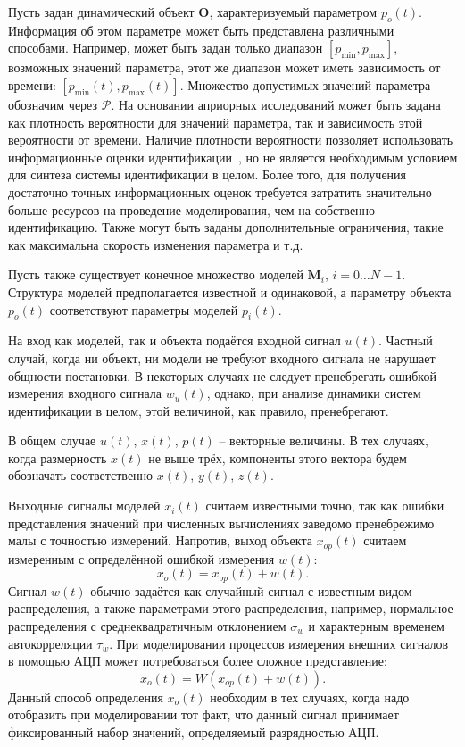 Пусть задан динамический объект $ \mathbf{O}$, характеризуемый параметром $p_o(t)$.
Информация об этом параметре может быть представлена
различными способами. Например, может быть задан только диапазон
$[p_{\min}, p_{\max}]$,
возможных значений параметра,
этот же диапазон может иметь зависимость от времени:
$[p_{\min}(t), p_{\max}(t)]$.
Множество допустимых значений параметра обозначим через $\mathcal{P}$.
На основании априорных исследований может
быть задана как плотность вероятности для значений параметра,
так и зависимость этой вероятности от времени. Наличие плотности вероятности
позволяет использовать информационные оценки идентификации~\cite{info_cipkin,atu_asau10},
но не является необходимым условием для синтеза системы идентификации в целом.
Более того, для получения достаточно точных информационных оценок
требуется затратить значительно больше ресурсов на проведение моделирования,
чем на собственно идентификацию.
Также могут быть заданы дополнительные ограничения, такие как максимальна скорость
изменения параметра и т.д.

Пусть также существует конечное множество моделей
\label{atu:d:N}$\mathbf{M}_i$, $i=0 \ldots N-1$.
Структура моделей предполагается известной и одинаковой,
а параметру объекта $p_o(t)$ соответствуют параметры моделей $p_{i}(t)$.

На вход как моделей, так и объекта подаётся входной сигнал \label{atu:d:u}$u(t)$.
Частный случай, когда ни объект, ни модели не требуют входного сигнала
не нарушает общности постановки. В некоторых случаях
не следует пренебрегать ошибкой измерения входного сигнала $w_u(t)$,
однако, при анализе динамики систем идентификации в целом,
этой величиной, как правило, пренебрегают.

В общем случае $u(t)$, $x(t)$, $p(t)$ -- векторные величины.
В тех случаях, когда размерность $x(t)$ не выше трёх,
компоненты этого вектора будем обозначать соответственно $x(t)$, $y(t)$, $z(t)$.

Выходные сигналы моделей
\label{atu:d:x}$x_i(t)$ считаем известными точно, так как ошибки
представления значений при численных вычислениях заведомо
пренебрежимо малы с точностью измерений. Напротив,
выход объекта $x_{op}(t)$ считаем измеренным
с определённой ошибкой измерения \label{atu:d:w}$w(t)$:
%
\[
  x_o(t) = x_{op}(t) + w(t).
\]
%
Сигнал $w(t)$ обычно задаётся как случайный сигнал с
известным видом распределения, а также параметрами этого распределения,
например, нормальное распределения с среднеквадратичным отклонением $\sigma_w$
и характерным временем автокорреляции $\tau_w$.
При моделировании процессов измерения внешних сигналов в помощью АЦП может потребоваться
более сложное представление:
%
\[
  x_o(t) = W( x_{op}(t) + w(t) ).
\]
%
Данный способ определения $x_o(t)$ необходим в тех случаях,
когда надо отобразить при моделировании тот факт,
что данный сигнал принимает фиксированный набор значений, определяемый разрядностью АЦП.

